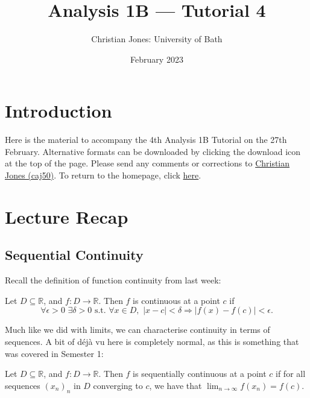 \documentclass[
  12pt,
  a4paper]{extarticle}
\title{Analysis 1B --- Tutorial 4}
\author{Christian Jones: University of Bath}
\date{February 2023}
\theoremstyle{plain}
\theoremstyle{definition}
\theoremstyle{plain}
\theoremstyle{plain}
\theoremstyle{plain}
\theoremstyle{plain}
\theoremstyle{definition}
\theoremstyle{definition}
\theoremstyle{remark}
\theoremstyle{remark}
\let\BeginKnitrBlock\begin \let\EndKnitrBlock\end
\renewcommand{\;}{\,}
\begin{document}
\maketitle

{
\setcounter{tocdepth}{2}
\tableofcontents
}
\newpage
{}

\hypertarget{introduction}{%
\section*{Introduction}\label{introduction}}

Here is the material to accompany the 4th Analysis 1B Tutorial on the 27th February. Alternative formats can be downloaded by clicking the download icon at the top of the page. Please send any comments or corrections to \href{mailto:caj50@bath.ac.uk}{Christian Jones (caj50)}. To return to the homepage, click \href{http://caj50.github.io/tutoring.html}{here}.

\hypertarget{lecture-recap}{%
\section{Lecture Recap}\label{lecture-recap}}

\hypertarget{sequential-continuity}{%
\subsection{Sequential Continuity}\label{sequential-continuity}}

Recall the definition of function continuity from last week:
\BeginKnitrBlock{definition}[Continuity]
{\label{def:def1} }Let \(D \subseteq \mathbb{R}\), and \(f: D \to \mathbb{R}\). Then \(f\) is continuous at a point \(c\) if \[\forall \epsilon > 0\;\;\exists \delta > 0\;\;\text{s.t.}\;\;\forall x \in D,\;\; \lvert x - c \rvert < \delta \Rightarrow \lvert f(x) - f(c) \rvert < \epsilon.\]
\EndKnitrBlock{definition}
Much like we did with limits, we can characterise continuity in terms of sequences. A bit of déjà vu here is completely normal, as this is something that was covered in Semester 1:

\BeginKnitrBlock{definition}[Sequential Continuity]
{\label{def:def2} }Let \(D \subseteq \mathbb{R}\), and \(f: D \to \mathbb{R}\). Then \(f\) is sequentially continuous at a point \(c\) if for all sequences \((x_n)_n\) in \(D\) converging to \(c\), we have that \(\lim_{n \to \infty}f(x_n) = f(c).\)
\EndKnitrBlock{definition}
\end{document}
